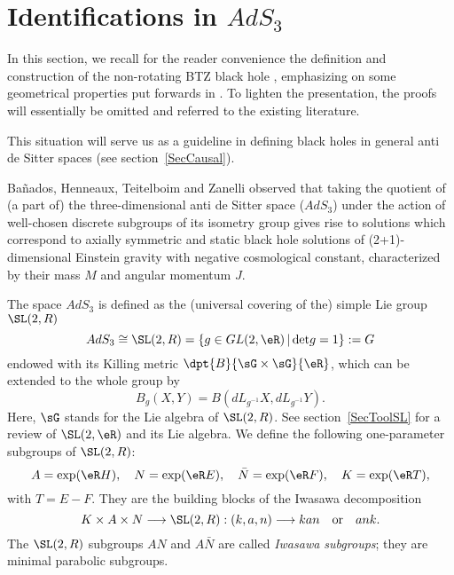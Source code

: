 \section{Identifications in \texorpdfstring{$AdS_3$}{AdS3}}\label{secBTZ}

In this section, we recall for the reader convenience the definition and construction of the non-rotating BTZ black hole \cite{BTZ_un,BTZ_deux}, emphasizing on some geometrical properties put forwards in \cite{BTZB_un,BDRS,Keio,Clement}. To lighten the presentation, the proofs will essentially be omitted and referred to the existing literature.

This situation will serve us as a guideline in defining black holes in general anti de Sitter spaces (see section~\ref{SecCausal}).

Ba\~nados, Henneaux, Teitelboim and Zanelli observed that taking the quotient of (a part of) the three-dimensional anti de Sitter space ($AdS_3$) under the action of well-chosen discrete subgroups of its isometry group gives rise to solutions which correspond to axially symmetric and static black hole solutions of (2+1)-dimensional Einstein gravity with negative cosmological constant, characterized by their mass $M$ and angular momentum $J$.

The space $AdS_3$ is defined as the (universal covering of the) simple Lie group $\SL(2,R)$
\begin{equation}\label{AdS3}
	AdS_3 \cong \SL(2,R) = \{g \in GL(2,\eR) \, | \, \mbox{det} g = 1 \}:= G
\end{equation}
endowed with its Killing metric $\dpt{B}{\sG\times\sG}{\eR}$, which can be extended to the whole group by
\begin{equation}
	B_g(X,Y)=B(dL_{g^{-1}}X,dL_{g^{-1}}Y).
\end{equation}
Here, $\sG$ stands for the Lie algebra of $\SL(2,R)$. See section~\ref{SecToolSL} for a review of $\SL(2,\eR)$ and its Lie algebra. We define the following one-parameter subgroups of $\SL(2,R)$:
\begin{equation}\label{IwasawaSubgroups}
	A = \exp(\eR H), \quad  N = \exp(\eR E), \quad \bar{N}=\exp(\eR
	F), \quad K=\exp(\eR T),
\end{equation}
with $T=E-F$. They are the building blocks of the Iwasawa decomposition
\begin{equation}
	K \times A \times N \longrightarrow \SL(2,R): (k,a,n)
	\longrightarrow kan \quad \mbox{or} \quad ank.
\end{equation}
The $\SL(2,R)$ subgroups $AN$ and $A\bar{N}$ are called \emph{Iwasawa subgroups}; they are minimal parabolic subgroups.

